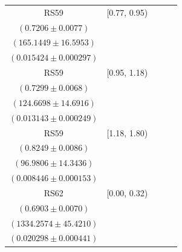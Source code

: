 {\begin{longtable}{|c|c|c|c|c|}
RS59 & [0.77, 0.95) & \begin{tabular}{@{}c@{}}$0.7170 \pm 0.0062$ \\ $(0.7206 \pm 0.0077)$\end{tabular} & \begin{tabular}{@{}c@{}}$165.9681 \pm 16.6781$ \\ $(165.1449 \pm 16.5953)$\end{tabular} & \begin{tabular}{@{}c@{}}$0.014461 \pm 0.000381$ \\ $(0.015424 \pm 0.000297)$\end{tabular} \\ \hline
RS59 & [0.95, 1.18) & \begin{tabular}{@{}c@{}}$0.7298 \pm 0.0064$ \\ $(0.7299 \pm 0.0068)$\end{tabular} & \begin{tabular}{@{}c@{}}$124.6922 \pm 14.6942$ \\ $(124.6698 \pm 14.6916)$\end{tabular} & \begin{tabular}{@{}c@{}}$0.012216 \pm 0.000323$ \\ $(0.013143 \pm 0.000249)$\end{tabular} \\ \hline
RS59 & [1.18, 1.80) & \begin{tabular}{@{}c@{}}$0.7149 \pm 0.0084$ \\ $(0.8249 \pm 0.0086)$\end{tabular} & \begin{tabular}{@{}c@{}}$111.9065 \pm 16.5512$ \\ $(96.9806 \pm 14.3436)$\end{tabular} & \begin{tabular}{@{}c@{}}$0.008176 \pm 0.000199$ \\ $(0.008446 \pm 0.000153)$\end{tabular} \\ \hline
\hline
RS62 & [0.00, 0.32) & \begin{tabular}{@{}c@{}}$0.7264 \pm 0.0056$ \\ $(0.6903 \pm 0.0070)$\end{tabular} & \begin{tabular}{@{}c@{}}$1266.5575 \pm 43.1852$ \\ $(1334.2574 \pm 45.4210)$\end{tabular} & \begin{tabular}{@{}c@{}}$0.017935 \pm 0.000555$ \\ $(0.020298 \pm 0.000441)$\end{tabular} \\ \hline

\end{longtable}}
